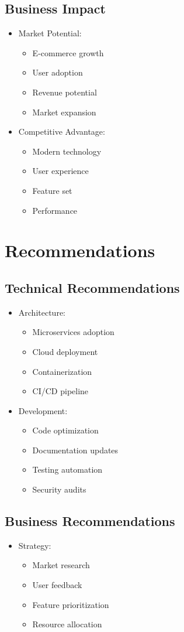 \subsection{Business Impact}
\begin{itemize}
    \item Market Potential:
    \begin{itemize}
        \item E-commerce growth
        \item User adoption
        \item Revenue potential
        \item Market expansion
    \end{itemize}
    \item Competitive Advantage:
    \begin{itemize}
        \item Modern technology
        \item User experience
        \item Feature set
        \item Performance
    \end{itemize}
\end{itemize}

\section{Recommendations}
\subsection{Technical Recommendations}
\begin{itemize}
    \item Architecture:
    \begin{itemize}
        \item Microservices adoption
        \item Cloud deployment
        \item Containerization
        \item CI/CD pipeline
    \end{itemize}
    \item Development:
    \begin{itemize}
        \item Code optimization
        \item Documentation updates
        \item Testing automation
        \item Security audits
    \end{itemize}
\end{itemize}

\subsection{Business Recommendations}
\begin{itemize}
    \item Strategy:
    \begin{itemize}
        \item Market research
        \item User feedback
        \item Feature prioritization
        \item Resource allocation
    \end{itemize}
\end{itemize} 